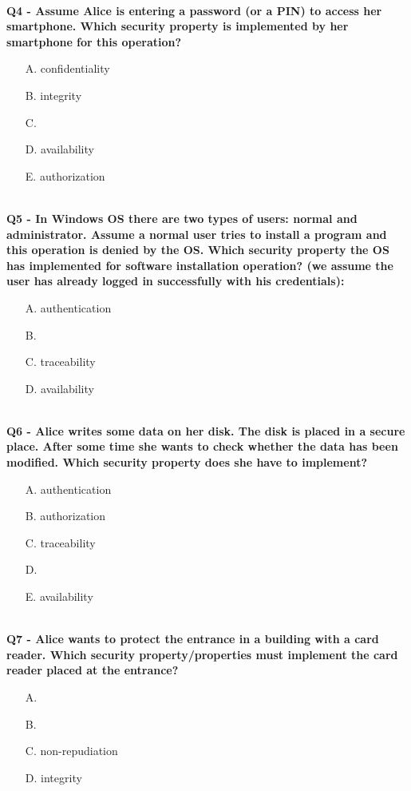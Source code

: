 
\textbf{\\Q4 - Assume Alice is entering a password (or a PIN) to access her smartphone. Which security property is implemented by her smartphone for this operation?}
\begin{enumerate}
	\item[A.] confidentiality
	\item[B.] integrity
	\item[C.] 
	\item[D.] availability
	\item[E.] authorization
\end{enumerate}


\textbf{\\Q5 - In Windows OS there are two types of users: normal and administrator. Assume a normal user tries to install a program and this operation is denied by the OS. Which security property the OS has implemented for software installation operation? (we assume the user has already logged in successfully with his credentials):}
\begin{enumerate}
	\item[A.] authentication
	\item[B.] 
	\item[C.] traceability
	\item[D.] availability
\end{enumerate}



\textbf{\\Q6 - Alice writes some data on her disk. The disk is placed in a secure place. After some time she wants to check whether the data has been modified. Which security property does she have to implement?}
\begin{enumerate}
	\item[A.] authentication
	\item[B.] authorization
	\item[C.] traceability
	\item[D.] 
	\item[E.] availability
\end{enumerate}

\textbf{\\Q7 - Alice wants to protect the entrance in a building with a card reader. Which security property/properties must implement the card reader placed at the entrance?}
\begin{enumerate}
	\item[A.] 
	\item[B.] 
	\item[C.] non-repudiation
	\item[D.] integrity
\end{enumerate}


